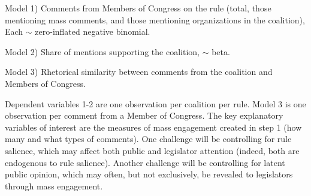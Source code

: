 Model 1) Comments from Members of Congress on the rule (total, those mentioning mass comments, and those mentioning organizations in the coalition), Each  $\sim$ zero-inflated negative binomial. 

Model 2) Share of mentions supporting the coalition,  $\sim$  beta. 

Model 3) Rhetorical similarity between comments from the coalition and Members of Congress. 

Dependent variables 1-2 are one observation per coalition per rule. Model 3 is one observation per comment from a Member of Congress. The key explanatory variables of interest are the measures of mass engagement created in step 1 (how many and what types of comments). One challenge will be controlling for rule salience, which may affect both public and legislator attention (indeed, both are endogenous to rule salience). Another challenge will be controlling for latent public opinion, which may often, but not exclusively, be revealed to legislators through mass engagement.%


